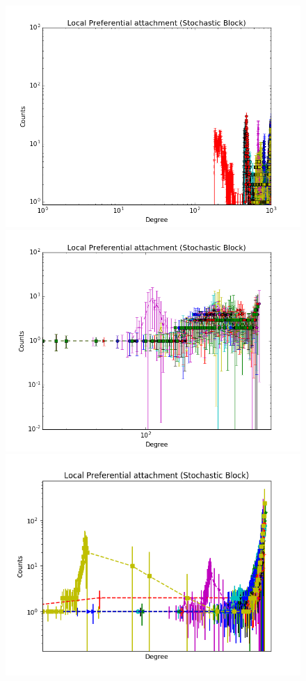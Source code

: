 \begin{figure}[ht]
	\endminipage
		\vspace{-0.29cm}
	\includegraphics[scale=0.27]{img/expe/4_ibp/figure_2}
	\endminipage
	\includegraphics[scale=0.27]{img/expe/5_ibp/figure_2} 
	\endminipage
	\includegraphics[scale=0.27]{img/expe/6_ibp/figure_2}

\end{figure}
